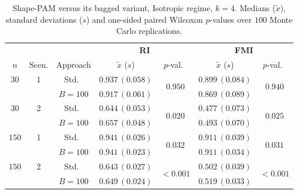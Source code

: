 \begin{table}[h]
\centering
\caption{Shape-PAM versus its bagged variant, Isotropic regime, $k=4$. Medians ($\tilde x$), standard deviations ($s$) and one-sided paired Wilcoxon $p$-values over $100$ Monte Carlo replications.}
\label{tab:pam-iso-k4}
\footnotesize
\begin{tabular}{cc c cc cc}
\toprule
& & & \multicolumn{2}{c}{\textbf{RI}} & \multicolumn{2}{c}{\textbf{FMI}} \\
\cmidrule(lr){4-5}\cmidrule(lr){6-7}
$n$ & Scen. & Approach & $\tilde x$ ($s$) & $p$-val.\ & $\tilde x$ ($s$) & $p$-val.\ \\
\midrule
$30$ & 1 & Std.\ & $0.937\,(0.058)$ & \multirow{2}{*}{$0.950$} & $0.899\,(0.084)$ & \multirow{2}{*}{$0.940$} \\
     &   & $B{=}100$ & $0.917\,(0.061)$ & & $0.869\,(0.089)$ & \\
$30$ & 2 & Std.\ & $0.644\,(0.053)$ & \multirow{2}{*}{$\mathbf{0.020}$} & $0.477\,(0.073)$ & \multirow{2}{*}{$\mathbf{0.025}$} \\
     &   & $B{=}100$ & $0.657\,(0.048)$ & & $0.493\,(0.070)$ & \\
$150$ & 1 & Std.\ & $0.941\,(0.026)$ & \multirow{2}{*}{$\mathbf{0.032}$} & $0.911\,(0.039)$ & \multirow{2}{*}{$\mathbf{0.031}$} \\
     &   & $B{=}100$ & $0.941\,(0.023)$ & & $0.911\,(0.034)$ & \\
$150$ & 2 & Std.\ & $0.643\,(0.027)$ & \multirow{2}{*}{$\mathbf{<\!0.001}$} & $0.502\,(0.039)$ & \multirow{2}{*}{$\mathbf{<\!0.001}$} \\
     &   & $B{=}100$ & $0.649\,(0.024)$ & & $0.519\,(0.033)$ & \\
\bottomrule
\end{tabular}
\end{table}

